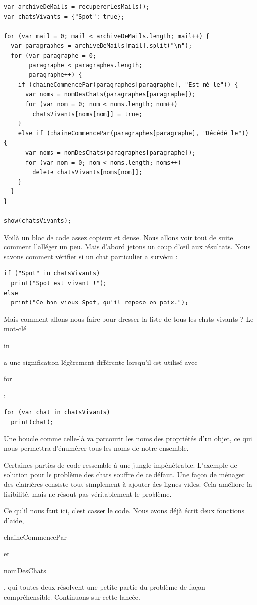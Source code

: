 \documentclass{FramateX}
\renewcommand{\texttt}[1]{\begin{sffamily}{#1}\end{sffamily}}
\begin{document}
\begin{lstlisting}
var archiveDeMails = recupererLesMails();
var chatsVivants = {"Spot": true};

for (var mail = 0; mail < archiveDeMails.length; mail++) {
  var paragraphes = archiveDeMails[mail].split("\n");
  for (var paragraphe = 0;
       paragraphe < paragraphes.length;
       paragraphe++) {
    if (chaineCommencePar(paragraphes[paragraphe], "Est né le")) {
      var noms = nomDesChats(paragraphes[paragraphe]);
      for (var nom = 0; nom < noms.length; nom++)
        chatsVivants[noms[nom]] = true;
    }
    else if (chaineCommencePar(paragraphes[paragraphe], "Décédé le")) {
      var noms = nomDesChats(paragraphes[paragraphe]);
      for (var nom = 0; nom < noms.length; noms++)
        delete chatsVivants[noms[nom]];
    }
  }
}

show(chatsVivants);
\end{lstlisting}
Voilà un bloc de code assez copieux et dense. Nous allons voir tout de
suite comment l'alléger un peu. Mais d'abord jetons un coup d'œil aux
résultats. Nous savons comment vérifier si un chat particulier a survécu
:

\begin{lstlisting}
if ("Spot" in chatsVivants)
  print("Spot est vivant !");
else
  print("Ce bon vieux Spot, qu'il repose en paix.");
\end{lstlisting}
Mais comment allons-nous faire pour dresser la liste de tous les chats
vivants ? Le mot-clé \texttt{in} a une signification légèrement
différente lorsqu'il est utilisé avec \texttt{for} :

\begin{lstlisting}
for (var chat in chatsVivants)
  print(chat);
\end{lstlisting}
Une boucle comme celle-là va parcourir les noms des propriétés d'un
objet, ce qui nous permettra d'énumérer tous les noms de notre ensemble.

\begin{center}\end{center}

Certaines parties de code ressemble à une jungle impénétrable. L'exemple
de solution pour le problème des chats souffre de ce défaut. Une façon
de ménager des clairières consiste tout simplement à ajouter des lignes
vides. Cela améliore la lisibilité, mais ne résout pas véritablement le
problème.

Ce qu'il nous faut ici, c'est casser le code. Nous avons déjà écrit deux
fonctions d'aide, \texttt{chaineCommencePar} et \texttt{nomDesChats},
qui toutes deux résolvent une petite partie du problème de façon
compréhensible. Continuons sur cette lancée.
\end{document}
